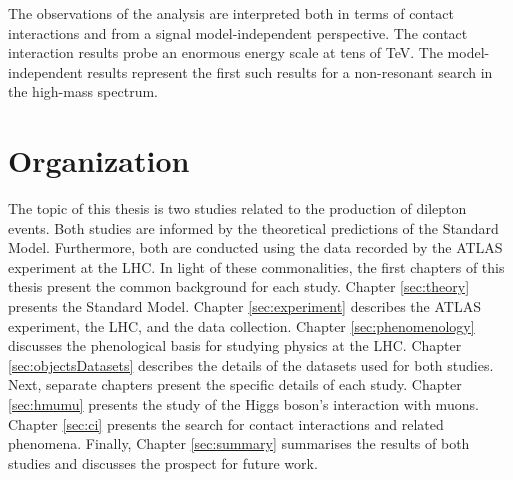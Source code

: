 The observations of the analysis are interpreted both in terms of contact interactions and from a signal model-independent perspective.
The contact interaction results probe an enormous energy scale at tens of TeV.
The model-independent results represent the first such results for a non-resonant search in the high-mass spectrum.

\section{Organization}

The topic of this thesis is two studies related to the production of dilepton events.
Both studies are informed by the theoretical predictions of the Standard Model.
Furthermore, both are conducted using the data recorded by the ATLAS experiment at the LHC.
In light of these commonalities, the first chapters of this thesis present the common background for each study.
Chapter \ref{sec:theory} presents the Standard Model.
Chapter \ref{sec:experiment} describes the ATLAS experiment, the LHC, and the data collection.
Chapter \ref{sec:phenomenology} discusses the phenological basis for studying physics at the LHC.
Chapter \ref{sec:objectsDatasets} describes the details of the datasets used for both studies.
Next, separate chapters present the specific details of each study.
Chapter \ref{sec:hmumu} presents the study of the Higgs boson's interaction with muons.
Chapter \ref{sec:ci} presents the search for contact interactions and related phenomena.
Finally, Chapter \ref{sec:summary} summarises the results of both studies and discusses the prospect for future work.


